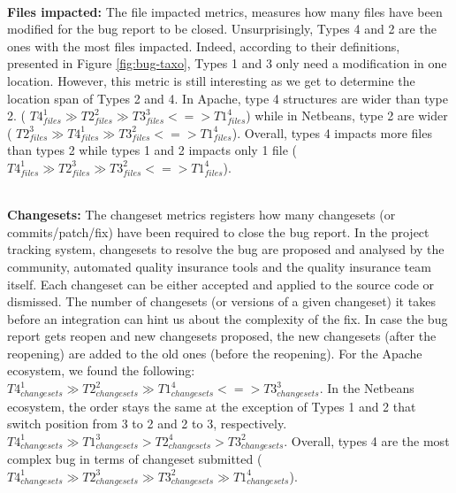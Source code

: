 \\ \vspace{0.1cm} {\bf Files impacted:} The file impacted metrics, measures how many files have been modified for the bug report to be closed.
Unsurprisingly, Types 4 and 2 are the ones with the most files impacted.
Indeed, according to their definitions, presented in Figure \ref{fig:bug-taxo}, Types 1 and 3 only need a modification in one location.
However, this metric is still interesting as we get to determine the location span of Types 2 and 4.
In Apache, type 4 structures are wider than type 2.
(
$
T4_{files}^1
 \gg
T2_{files}^2
 \gg
T3_{files}^3
< = >
T1_{files}^4
$)
while in Netbeans, type 2 are wider (
$
T2_{files}^3
 \gg
T4_{files}^1
 \gg
T3_{files}^2
< = >
T1_{files}^4
$).
Overall, types 4 impacts more files than types 2 while types 1 and 2 impacts only 1 file (
$
T4_{files}^1
 \gg
T2_{files}^3
 \gg
T3_{files}^2
< = >
T1_{files}^4
$).

\\ \vspace{0.1cm} {\bf Changesets: } The changeset metrics registers how many changesets (or commits/patch/fix) have been required to close the bug report.
In the project tracking system, changesets to resolve the bug are proposed and analysed by the community, automated quality insurance tools and the quality insurance team itself.
Each changeset can be either accepted and applied to the source code or dismissed.
The number of changesets (or versions of a given changeset) it takes before an integration can hint us about the complexity of the fix.
In case the bug report gets reopen and new changesets proposed, the new changesets (after the reopening) are added to the old ones (before the reopening).
For the Apache ecosystem, we found the following:
$
T4_{changesets}^1
 \gg
T2_{changesets}^2
 \gg
T1_{changesets}^4
 <=>
T3_{changesets}^3
$.
In the Netbeans ecosystem, the order stays the same at the exception of Types 1 and 2 that switch position from 3 to 2 and 2 to 3, respectively.
$
T4_{changesets}^1
 \gg
T1_{changesets}^3
 >
T2_{changesets}^4
 >
T3_{changesets}^2
$.
Overall, types 4 are the most complex bug in terms of changeset submitted (
$
T4_{changesets}^1
 \gg
T2_{changesets}^3
 \gg
T3_{changesets}^2
 \gg
T1_{changesets}^4
$).

